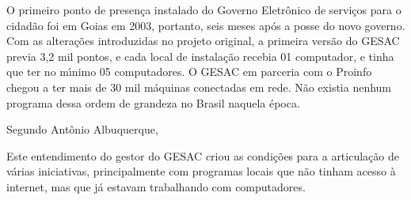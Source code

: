 \documentclass[
12pt,		%
openright,	%
twoside,  %
a4paper,			%
chapter=TITLE,		%
english,			%
french,				%
spanish,			%
brazil				%
]{USPSC-classe/USPSC}
\begin{document}
O primeiro ponto de presen\c{c}a instalado do Governo Eletr\^onico de servi\c{c}os para o cidad\~ao foi em Goias em 2003, portanto, seis meses ap\'os a posse do novo governo. Com as altera\c{c}\~oes introduzidas no projeto original, a primeira vers\~ao do GESAC previa 3,2 mil pontos, e cada local de instala\c{c}\~ao recebia 01 computador, e tinha que ter no m\'{\i}nimo 05 computadores. O GESAC em parceria com o Proinfo chegou a ter mais de 30 mil m\'aquinas conectadas em rede. N\~ao existia nenhum programa dessa ordem de grandeza no Brasil naquela \'epoca.

















Segundo Ant\^onio Albuquerque,


















\noindent\begin{center}\mbox{\centering{}}\end{center}


Este entendimento do gestor do GESAC criou as condi\c{c}\~oes para a articula\c{c}\~ao de v\'arias iniciativas, principalmente com programas locais que n\~ao tinham acesso \`a internet, mas que j\'a estavam trabalhando com computadores.
\end{document}
